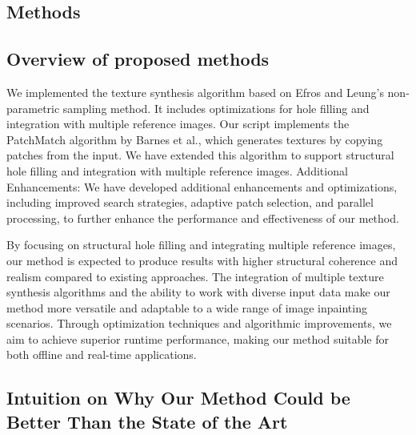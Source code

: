 \begin{methods}
\section{Methods}
\subsection{Overview of proposed methods}

We implemented the texture synthesis algorithm based on Efros and Leung's non-parametric sampling method. It includes optimizations for hole filling and integration with multiple reference images. Our script implements the PatchMatch algorithm by Barnes et al., which generates textures by copying patches from the input. We have extended this algorithm to support structural hole filling and integration with multiple reference images.
Additional Enhancements: We have developed additional enhancements and optimizations, including improved search strategies, adaptive patch selection, and parallel processing, to further enhance the performance and effectiveness of our method.

 By focusing on structural hole filling and integrating multiple reference images, our method is expected to produce results with higher structural coherence and realism compared to existing approaches. The integration of multiple texture synthesis algorithms and the ability to work with diverse input data make our method more versatile and adaptable to a wide range of image inpainting scenarios. Through optimization techniques and algorithmic improvements, we aim to achieve superior runtime performance, making our method suitable for both offline and real-time applications.

\subsection{Intuition on Why Our Method Could be Better Than the State of the Art}


\end{methods}
